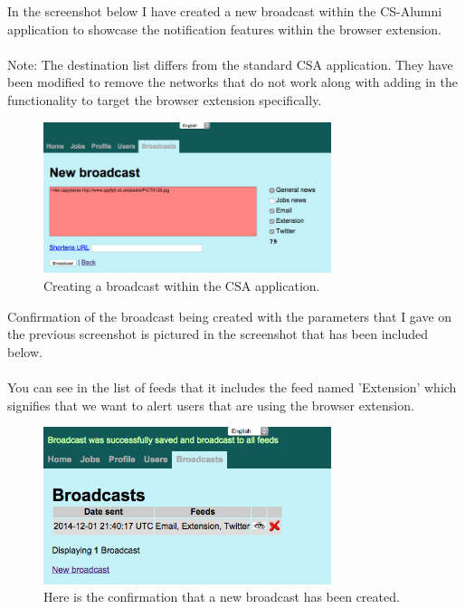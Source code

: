 \documentclass{article}
\begin{document}
In the screenshot below I have created a new broadcast within the CS-Alumni application to showcase the notification features within the browser extension.\\
\\
Note: The destination list differs from the standard CSA application. They have been modified to remove the networks that do not work along with adding in the functionality to target the browser extension specifically.\\

\begin{figure}[H]
\centering
\includegraphics[width=0.75\textwidth]{createbc}
\caption{Creating a broadcast within the CSA application.}
\end{figure}

\newpage
Confirmation of the broadcast being created with the parameters that I gave on the previous screenshot is pictured in the screenshot that has been included below.\\
\\
You can see in the list of feeds that it includes the feed named 'Extension' which signifies that we want to alert users that are using the browser extension.

\begin{figure}[H]
\centering
\includegraphics[width=0.75\textwidth]{confbc}
\caption{Here is the confirmation that a new broadcast has been created.}
\end{figure}
\end{document}
